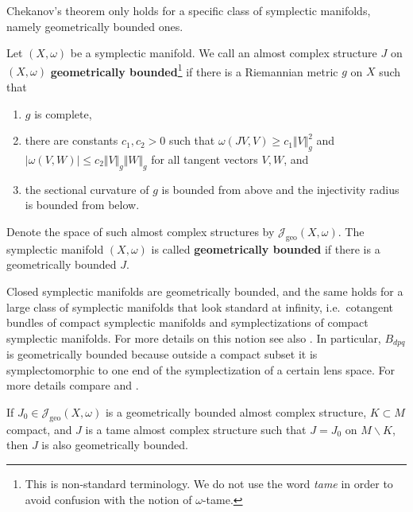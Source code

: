 \documentclass[12pt,a4paper,draft]{scrartcl}
\begin{document}
Chekanov's theorem only holds for a specific class of symplectic manifolds, namely geometrically bounded ones.

\begin{definition}
    \label{def:geobdd}
    Let $(X,\omega)$ be a symplectic manifold.
We call an almost complex structure $J$ on $(X,\omega)$ \textbf{geometrically bounded}\footnote{This is non-standard terminology.
We do not use the word \textit{tame} in order to avoid confusion with the notion of $\omega$-tame.} if there is a Riemannian metric $g$ on $X$ such that 
    \begin{enumerate}
        \item $g$ is complete,
        \item there are constants $c_1,c_2 > 0$ such that $\omega(JV,V) \geqslant c_1 \Vert V \Vert_g^2$ and $\vert \omega(V,W) \vert \leqslant c_2 \Vert V \Vert_g \Vert W \Vert_g$ for all tangent vectors $V,W$, and
        \item the sectional curvature of $g$ is bounded from above and the injectivity radius is bounded from below.
    \end{enumerate}
    Denote the space of such almost complex structures by $\mathcal{J}_{\text{geo}}(X,\omega)$.
    The symplectic manifold $(X,\omega)$ is called \textbf{geometrically bounded} if there is a geometrically bounded $J$. 
\end{definition}

\begin{remark}
  \label{rem:Bdpq_geometrically_bounded}
    Closed symplectic manifolds are geometrically bounded, and the same holds for a large class of symplectic manifolds that look standard at infinity, i.e.\ cotangent bundles of compact symplectic manifolds and symplectizations of compact symplectic manifolds.
For more details on this notion see also \cite[Chapter X, Definition 2.2.1]{AudLaf94}. In particular, $B_{dpq}$ is geometrically bounded because outside a compact subset it is symplectomorphic to one end of the symplectization of a certain lens space. For more details compare \cite{Eva19} and \cite{evans2021atfs}.
\end{remark}

\begin{remark}
  \label{rem:J_compactly_perturbed}
  If $J_0 \in \mathcal{J}_\text{geo}(X,ω)$ is a geometrically bounded almost complex structure, $K ⊂ M$ compact, and $J$ is a tame almost complex structure such that $J = J_0$ on $M ∖ K$, then $J$ is also geometrically bounded.
\end{remark}
\end{document}

